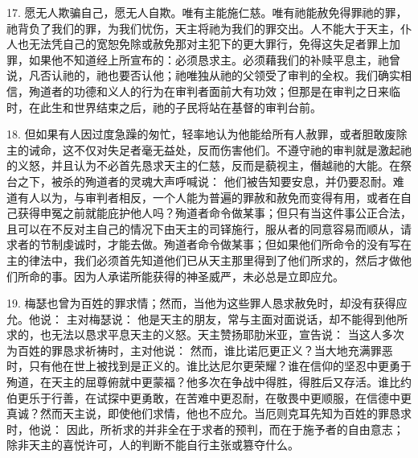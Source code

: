 17. 愿无人欺骗自己，愿无人自欺。唯有主能施仁慈。唯有祂能赦免得罪祂的罪，祂背负了我们的罪，为我们忧伤，天主将祂为我们的罪交出。人不能大于天主，仆人也无法凭自己的宽恕免除或赦免那对主犯下的更大罪行，免得这失足者罪上加罪，如果他不知道经上所宣布的：必须恳求主。必须藉我们的补赎平息主，祂曾说，凡否认祂的，祂也要否认他；祂唯独从祂的父领受了审判的全权。我们确实相信，殉道者的功德和义人的行为在审判者面前大有功效；但那是在审判之日来临时，在此生和世界结束之后，祂的子民将站在基督的审判台前。\par

18. 但如果有人因过度急躁的匆忙，轻率地认为他能给所有人赦罪，或者胆敢废除主的诫命，这不仅对失足者毫无益处，反而伤害他们。不遵守祂的审判就是激起祂的义怒，并且认为不必首先恳求天主的仁慈，反而是藐视主，僭越祂的大能。在祭台之下，被杀的殉道者的灵魂大声呼喊说： 他们被告知要安息，并仍要忍耐。难道有人以为，与审判者相反，一个人能为普遍的罪赦和赦免而变得有用，或者在自己获得申冤之前就能庇护他人吗？殉道者命令做某事；但只有当这件事公正合法，且可以在不反对主自己的情况下由天主的司铎施行，服从者的同意容易而顺从，请求者的节制虔诚时，才能去做。殉道者命令做某事；但如果他们所命令的没有写在主的律法中，我们必须首先知道他们已从天主那里得到了他们所求的，然后才做他们所命的事。因为人承诺所能获得的神圣威严，未必总是立即应允。\par

19. 梅瑟也曾为百姓的罪求情；然而，当他为这些罪人恳求赦免时，却没有获得应允。他说： 主对梅瑟说：  他是天主的朋友，常与主面对面说话，却不能得到他所求的，也无法以恳求平息天主的义怒。天主赞扬耶肋米亚，宣告说：  当这人多次为百姓的罪恳求祈祷时，主对他说：  然而，谁比诺厄更正义？当大地充满罪恶时，只有他在世上被找到是正义的。谁比达尼尔更荣耀？谁在信仰的坚忍中更勇于殉道，在天主的屈尊俯就中更蒙福？他多次在争战中得胜，得胜后又存活。谁比约伯更乐于行善，在试探中更勇敢，在苦难中更忍耐，在敬畏中更顺服，在信德中更真诚？然而天主说，即使他们求情，他也不应允。当厄则克耳先知为百姓的罪恳求时，他说：  因此，所祈求的并非全在于求者的预判，而在于施予者的自由意志；除非天主的喜悦许可，人的判断不能自行主张或篡夺什么。\par

